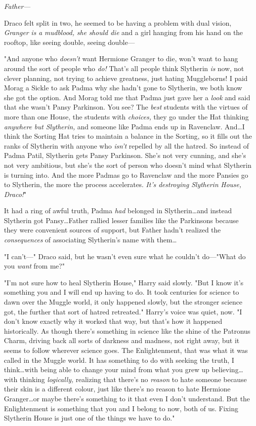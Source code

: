 \emph{Father—}

Draco felt split in two, he seemed to be having a problem with dual vision,
\emph{Granger is a mudblood, she should die} and a girl hanging from his hand
on the rooftop, like seeing double, seeing double—

"And anyone who \emph{doesn’t} want Hermione Granger to die, won’t want to hang
around the sort of people who \emph{do!} That’s all people think Slytherin
\emph{is} now, not clever planning, not trying to achieve greatness, just
hating Muggleborns! I paid Morag a Sickle to ask Padma why she hadn’t gone to
Slytherin, we both know she got the option. And Morag told me that Padma just
gave her a \emph{look} and said that she wasn’t Pansy Parkinson. You see? The
\emph{best} students with the virtues of more than one House, the students with
\emph{choices,} they go under the Hat thinking \emph{anywhere but Slytherin,}
and someone like Padma ends up in Ravenclaw. And…I think the Sorting
Hat tries to maintain a balance in the Sorting, so it fills out the ranks of
Slytherin with anyone who \emph{isn’t} repelled by all the hatred. So instead
of Padma Patil, Slytherin gets Pansy Parkinson. She’s not very cunning, and
she’s not very ambitious, but she’s the sort of person who doesn’t mind what
Slytherin is turning into. And the more Padmas go to Ravenclaw and the more
Pansies go to Slytherin, the more the process accelerates. \emph{It’s
destroying Slytherin House, Draco!}"

It had a ring of awful truth, Padma \emph{had} belonged in Slytherin…and
instead Slytherin got Pansy…Father rallied lesser families like the
Parkinsons because they were convenient sources of support, but Father hadn’t
realized the \emph{consequences} of associating Slytherin’s name with
them…

"I can’t—" Draco said, but he wasn’t even sure what he couldn’t do—"What do
you \emph{want} from me?"

"I’m not sure how to heal Slytherin House," Harry said slowly. "But I know it’s
something you and I will end up having to do. It took centuries for science to
dawn over the Muggle world, it only happened slowly, but the stronger science
got, the further that sort of hatred retreated." Harry’s voice was quiet, now.
"I don’t know exactly why it worked that way, but that’s how it happened
historically. As though there’s something in science like the shine of the
Patronus Charm, driving back all sorts of darkness and madness, not right away,
but it seems to follow wherever science goes. The Enlightenment, that was what
it was called in the Muggle world. It has something to do with seeking the
truth, I think…with being able to change your mind from what you grew
up believing…with thinking \emph{logically,} realizing that there’s no
\emph{reason} to hate someone because their skin is a different colour, just
like there’s no reason to hate Hermione Granger…or maybe there’s
something to it that even I don’t understand. But the Enlightenment is
something that you and I belong to now, both of us. Fixing Slytherin House is
just one of the things we have to do."

